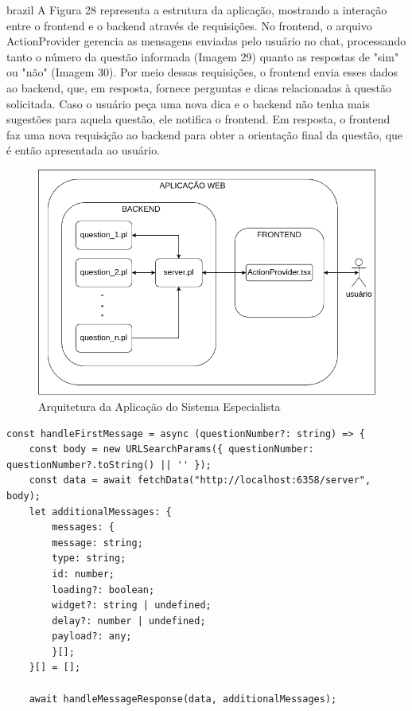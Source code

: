 \begin{otherlanguage*}{brazil}
A Figura 28 representa a estrutura da aplicação, mostrando a interação entre o frontend e o backend através de requisições. No frontend, o arquivo ActionProvider gerencia as mensagens enviadas pelo usuário no chat, processando tanto o número da questão informada (Imagem 29) quanto as respostas de "sim" ou "não" (Imagem 30). Por meio dessas requisições, o frontend envia esses dados ao backend, que, em resposta, fornece perguntas e dicas relacionadas à questão solicitada. Caso o usuário peça uma nova dica e o backend não tenha mais sugestões para aquela questão, ele notifica o frontend. Em resposta, o frontend faz uma nova requisição ao backend para obter a orientação final da questão, que é então apresentada ao usuário.

\begin{figure}[h!]
    \centering
            \caption{Arquitetura da Aplicação do Sistema Especialista}
            \label{fig:ModeloConceitual}
        \includegraphics[scale=0.6]{pictures/arquitetura.png}
\end{figure}

\begin{lstlisting}
const handleFirstMessage = async (questionNumber?: string) => {
    const body = new URLSearchParams({ questionNumber: questionNumber?.toString() || '' });
    const data = await fetchData("http://localhost:6358/server", body);
    let additionalMessages: {
        messages: {
        message: string;
        type: string;
        id: number;
        loading?: boolean;
        widget?: string | undefined;
        delay?: number | undefined;
        payload?: any;
        }[];
    }[] = [];

    await handleMessageResponse(data, additionalMessages);    
    

\end{lstlisting}
\end{otherlanguage*}

